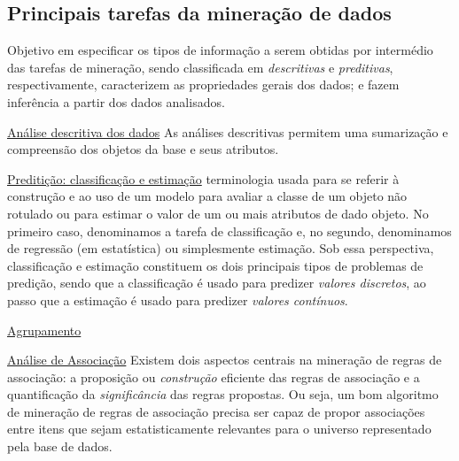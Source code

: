 \subsection{Principais tarefas da mineração de dados}

Objetivo em especificar os tipos de informação a serem obtidas por intermédio das tarefas de mineração, sendo classificada em \textit{descritivas} e \textit{preditivas}, respectivamente, caracterizem as propriedades gerais dos dados; e fazem inferência a partir dos dados analisados.

\underline{Análise descritiva dos dados}
As análises descritivas permitem uma sumarização e compreensão dos objetos da base e seus atributos.

\underline{Preditição: classificação e estimação}
terminologia usada para se referir à construção e ao uso de um modelo para avaliar a classe de um objeto não rotulado ou para estimar o valor de um ou mais atributos de dado objeto.
No primeiro caso, denominamos a tarefa de classificação e, no segundo, denominamos de regressão (em estatística) ou simplesmente estimação.
Sob essa perspectiva, classificação e estimação constituem os dois principais tipos de problemas de predição, sendo que a classificação é usado para predizer \textit{valores discretos}, ao passo que a estimação é usado para predizer \textit{valores contínuos}.

\underline{Agrupamento}

\underline{Análise de Associação}
Existem dois aspectos centrais na mineração de regras de associação:  a proposição ou \textit{construção} eficiente das regras de associação e a quantificação da \textit{significância} das regras propostas.
Ou seja, um bom algoritmo de mineração de regras de associação precisa ser capaz de propor associações entre itens que sejam estatisticamente relevantes para o universo representado pela
base de dados.
